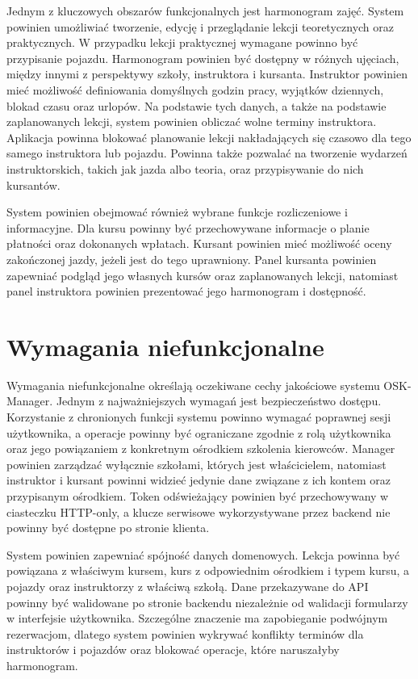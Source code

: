 Jednym z kluczowych obszarów funkcjonalnych jest harmonogram zajęć. System powinien umożliwiać tworzenie, edycję i przeglądanie lekcji teoretycznych oraz praktycznych. W przypadku lekcji praktycznej wymagane powinno być przypisanie pojazdu. Harmonogram powinien być dostępny w różnych ujęciach, między innymi z perspektywy szkoły, instruktora i kursanta. Instruktor powinien mieć możliwość definiowania domyślnych godzin pracy, wyjątków dziennych, blokad czasu oraz urlopów. Na podstawie tych danych, a także na podstawie zaplanowanych lekcji, system powinien obliczać wolne terminy instruktora. Aplikacja powinna blokować planowanie lekcji nakładających się czasowo dla tego samego instruktora lub pojazdu. Powinna także pozwalać na tworzenie wydarzeń instruktorskich, takich jak jazda albo teoria, oraz przypisywanie do nich kursantów.

System powinien obejmować również wybrane funkcje rozliczeniowe i informacyjne. Dla kursu powinny być przechowywane informacje o planie płatności oraz dokonanych wpłatach. Kursant powinien mieć możliwość oceny zakończonej jazdy, jeżeli jest do tego uprawniony. Panel kursanta powinien zapewniać podgląd jego własnych kursów oraz zaplanowanych lekcji, natomiast panel instruktora powinien prezentować jego harmonogram i dostępność.

\section{Wymagania niefunkcjonalne}
\label{sec:wymaganiaNiefunkcjonalne}

Wymagania niefunkcjonalne określają oczekiwane cechy jakościowe systemu OSK-Manager. Jednym z najważniejszych wymagań jest bezpieczeństwo dostępu. Korzystanie z chronionych funkcji systemu powinno wymagać poprawnej sesji użytkownika, a operacje powinny być ograniczane zgodnie z rolą użytkownika oraz jego powiązaniem z konkretnym ośrodkiem szkolenia kierowców. Manager powinien zarządzać wyłącznie szkołami, których jest właścicielem, natomiast instruktor i kursant powinni widzieć jedynie dane związane z ich kontem oraz przypisanym ośrodkiem. Token odświeżający powinien być przechowywany w ciasteczku HTTP-only, a klucze serwisowe wykorzystywane przez backend nie powinny być dostępne po stronie klienta.

System powinien zapewniać spójność danych domenowych. Lekcja powinna być powiązana z właściwym kursem, kurs z odpowiednim ośrodkiem i typem kursu, a pojazdy oraz instruktorzy z właściwą szkołą. Dane przekazywane do API powinny być walidowane po stronie backendu niezależnie od walidacji formularzy w interfejsie użytkownika. Szczególne znaczenie ma zapobieganie podwójnym rezerwacjom, dlatego system powinien wykrywać konflikty terminów dla instruktorów i pojazdów oraz blokować operacje, które naruszałyby harmonogram.

